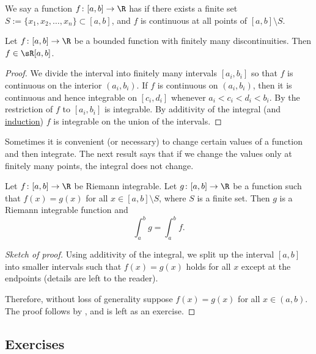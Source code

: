 \documentclass[12pt]{book}
\begin{document}
We say a function $f \colon [a,b] \to \R$ has \emph{} if there exists a finite set $S := \{ x_1, x_2, \ldots, x_n \}
\subset [a,b]$, and $f$ is continuous
at all points of $[a,b] \setminus S$.

\begin{thm}
Let $f \colon [a,b] \to \R$ be a bounded function with finitely
many discontinuities.
Then $f \in \sR[a,b]$.
\end{thm}

\begin{proof}
We divide the interval into finitely many intervals $[a_i,b_i]$
so that $f$ is continuous
on the interior $(a_i,b_i)$.
If $f$ is continuous on $(a_i,b_i)$,
then it is continuous and hence integrable on $[c_i,d_i]$ whenever $a_i < c_i < d_i < b_i$.  
By 
the restriction
of $f$ to $[a_i,b_i]$ is integrable.
By additivity of the integral (and
\hyperref[induction:thm]{induction}) $f$ is integrable on the union of the intervals.
\end{proof}

Sometimes it is convenient (or necessary)
to change certain values of a function and
then integrate.
The next result says
that if we change the values only at finitely
many points, the integral does not change.

\begin{prop}
Let $f \colon [a,b] \to \R$ be Riemann integrable.
Let $g \colon [a,b] \to
\R$ be a function such that $f(x) = g(x)$ for all $x \in [a,b] \setminus S$,
where $S$ is a finite set.
Then $g$ is a Riemann integrable function
and
\begin{equation*}
\int_a^b g = \int_a^b f.
\end{equation*}
\end{prop}

\begin{proof}[Sketch of proof]
Using additivity of the integral, we split up the interval $[a,b]$ into
smaller intervals such that $f(x) = g(x)$ holds for all $x$ except at the
endpoints (details are left to the reader).

Therefore, without loss of generality suppose $f(x) = g(x)$ for
all $x \in (a,b)$.
The proof follows by ,
and is left as an exercise.
\end{proof}


\subsection*{Exercises}
\end{document}
